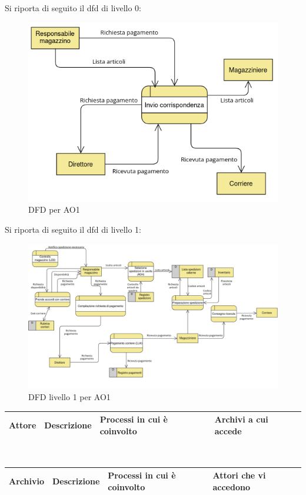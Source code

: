 \documentclass[a4paper,12pt]{article}
\begin{document}
Si riporta di seguito il dfd di livello 0:
\begin{figure}[H]
  \centering
  \includegraphics[width=0.8\linewidth]{assets/dfd_0_AO1.png}
  \caption{DFD per AO1}
\end{figure}
Si riporta di seguito il dfd di livello 1:
\begin{figure}[H]
  \centering
  \includegraphics[width=0.8\linewidth]{assets/dfd_1_AO1.png}
  \caption{DFD livello 1 per AO1}
\end{figure}

\begin{center}
  
  \begin{tabularx}{\textwidth}{|*{4}{Y|}}
    \hline
    \textbf{Attore} & \textbf{Descrizione} & \textbf{Processi in cui è coinvolto} & \textbf{Archivi a cui accede} \\ \hline
  \end{tabularx}
  \\
  \begin{tabularx}{\textwidth}{|*{4}{Y|}}
    \hline
    \textbf{Archivio} & \textbf{Descrizione} & \textbf{Processi in cui è coinvolto} & \textbf{Attori che vi accedono} \\ \hline
  \end{tabularx}
\end{center}
\end{document}
